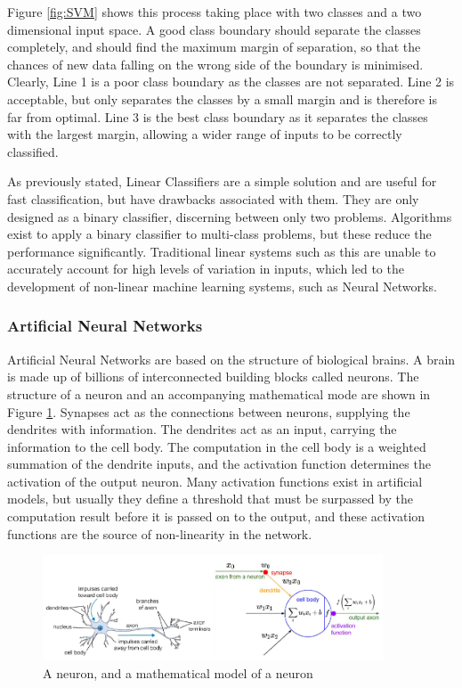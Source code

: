 \documentclass[12pt]{article}
\begin{document}
Figure \ref{fig:SVM} shows this process taking place with two classes and a two dimensional input space. A good class boundary should separate the classes completely, and should find the maximum margin of separation, so that the chances of new data falling on the wrong side of the boundary is minimised. Clearly, Line 1 is a poor class boundary as the classes are not separated. Line 2 is acceptable, but only separates the classes by a small margin and is therefore is far from optimal. Line 3 is the best class boundary as it separates the classes with the largest margin, allowing a wider range of inputs to be correctly classified.

As previously stated, Linear Classifiers are a simple solution and are useful for fast classification, but have drawbacks associated with them. They are only designed as a binary classifier, discerning between only two problems. Algorithms exist to apply a binary classifier to multi-class problems, but these reduce the performance significantly. Traditional linear systems such as this are unable to accurately account for high levels of variation in inputs, which led to the development of non-linear machine learning systems, such as Neural Networks.

\subsubsection{Artificial Neural Networks}
\label{sec:Background-ML-NN}

Artificial Neural Networks are based on the structure of biological brains. A brain is made up of billions of interconnected building blocks called neurons. The structure of a neuron and an accompanying mathematical mode are shown in Figure \ref{fig:neuron}. Synapses act as the connections between neurons, supplying the dendrites with information. The dendrites act as an input, carrying the information to the cell body. The computation in the cell body is a weighted summation of the dendrite inputs, and the activation function determines the activation of the output neuron\cite{neuron}. Many activation functions exist in artificial models, but usually they define a threshold that must be surpassed by the computation result before it is passed on to the output, and these activation functions are the source of non-linearity in the network.

\begin{figure}[H]
\centering
\includegraphics[width=0.9\textwidth]{figures/neuron.png}
\caption{A neuron, and a mathematical model of a neuron\cite{neuron}}
\label{fig:neuron}
\end{figure}
\end{document}
